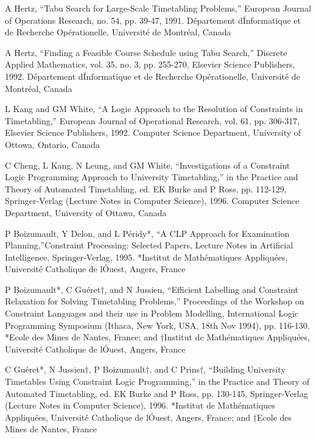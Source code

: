 \begin{thebibliography}{99}
A Hertz, “Tabu Search for Large-Scale Timetabling Problems,” European Journal of
Operations Research, no. 54, pp. 39-47, 1991. D\'epartement d\'Informatique et de
Recherche Op\'erationelle, Universit\'e de Montr\'eal, Canada

A Hertz, “Finding a Feasible Course Schedule using Tabu Search,” Discrete Applied
Mathematics, vol. 35, no. 3, pp. 255-270, Elsevier Science Publishers, 1992.
D\'epartement d\'Informatique et de Recherche Op\'erationelle, Universit\'e de
Montr\'eal, Canada

L Kang and GM White, “A Logic Approach to the Resolution of Constraints in
Timetabling,” European Journal of Operational Research, vol. 61, pp. 306-317, Elsevier
Science Publishers, 1992. Computer Science Department, University of Ottowa,
Ontario, Canada

C Cheng, L Kang, N Leung, and GM White, “Investigations of a Constraint Logic Programming Approach to University Timetabling,” in the Practice and Theory of
Automated Timetabling, ed. EK Burke and P Ross, pp. 112-129, Springer-Verlag (Lecture
Notes in Computer Science), 1996. Computer Science Department, University
of Ottawa, Canada

P Boizumault, Y Delon, and L P\'eridy*, ``A CLP Approach for Examination Planning,''Constraint Processing: Selected Papers, Lecture Notes in Artificial Intelligence,
Springer-Verlag, 1995. *Institut de Math\'ematiques Appliqu\'ees, Universit\'e Catholique
de l\'Ouest, Angers, France

P Boizumault*, C Gu\'eret†, and N Jussien, “Efficient Labelling and Constraint Relaxation for Solving Timetabling Problems,” Proceedings of the Workshop on Constraint
Languages and their use in Problem Modelling, International Logic Programming Symposium
(Ithaca, New York, USA, 18th Nov 1994), pp. 116-130. *Ecole des Mines de
Nantes, France; and †Institut de Math\'ematiques Appliqu\'ees, Universit\'e Catholique
de l\'Ouest, Angers, France

C Gu\'eret*, N Jussien†, P Boizumault†, and C Prins†, “Building University Timetables Using Constraint Logic Programming,” in the Practice and Theory of Automated
Timetabling, ed. EK Burke and P Ross, pp. 130-145, Springer-Verlag (Lecture Notes
in Computer Science), 1996. *Institut de Math\'ematiques Appliqu\'ees, Universit\'e
Catholique de l\'Ouest, Angers, France; and †Ecole des Mines de Nantes, France

\end{thebibliography}
